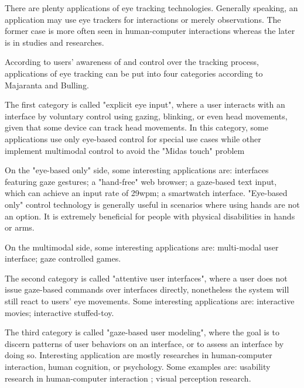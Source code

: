 \documentclass[english]{tktltiki}
\begin{document}
There are plenty applications of eye tracking technologies. Generally speaking, an application may use eye trackers for interactions or merely observations. The former case is more often seen in human-computer interactions whereas the later is in studies and researches. 

According to users' awareness of and control over the tracking process, applications of eye tracking can be put into four categories according to Majaranta and Bulling.\cite{majaranta14}

The first category is called "explicit eye input", where a user interacts with an interface by voluntary control using gazing, blinking, or even head movements, given that some device can track head movements. In this category, some applications use only eye-based control for special use cases while other implement multimodal control to avoid the "Midas touch" problem \cite{Velichkovsky97}

On the "eye-based only" side, some interesting applications are: interfaces featuring gaze gestures\cite{Drewes:2007:ICU:1778331.1778385}\cite{Ohno:1998:FEG:786112.786297}; a "hand-free" web browser\cite{5090980}; a gaze-based text input\cite{wardmackay2002}, which can achieve an input rate of 29wpm; a smartwatch interface\cite{Hansen:2015:GIT:2800835.2804332}. "Eye-based only" control technology is generally useful in scenarios where using hands are not an option. It is extremely beneficial for people with physical disabilities in hands or arms. 

On the multimodal side, some interesting applications are: multi-modal user interface\cite{538404}\cite{maglio2000}; gaze controlled games\cite{Isokoski:2009:GCG:1667488.1667491}. 

The second category is called "attentive user interfaces", where a user does not issue gaze-based commands over interfaces directly, nonetheless the system will still react to users' eye movements. Some interesting applications are: interactive movies\cite{doi:10.1080/14626260500476523}; interactive stuffed-toy\cite{Yonezawa:2007:GBS:1322192.1322218}.

The third category is called "gaze-based user modeling", where the goal is to discern patterns of user behaviors on an interface, or to assess an interface by doing so. Interesting application are mostly researches in human-computer interaction, human cognition, or psychology. Some examples are: usability research in human-computer interaction \cite{Poole05eyetracking} \cite{Jacob2003573}; visual perception research\cite{John2004}.
\end{document}
